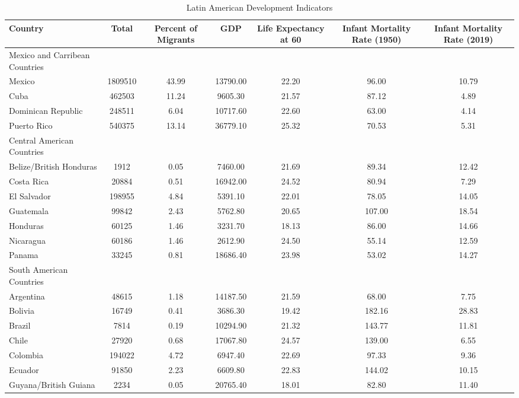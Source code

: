 \begin{table}[ht]
\centering
\caption{Latin American Development Indicators} 
\begin{tabular}{l|cccccc}
  \hline
Country & Total & Percent of Migrants & GDP & Life Expectancy at 60 & Infant Mortality Rate (1950) & Infant Mortality Rate (2019) \\ 
  \hline
Mexico and Carribean Countries &  &  &  &  &  &  \\ 
  Mexico & 1809510 & 43.99 & 13790.00 & 22.20 & 96.00 & 10.79 \\ 
  Cuba & 462503 & 11.24 & 9605.30 & 21.57 & 87.12 & 4.89 \\ 
  Dominican Republic & 248511 & 6.04 & 10717.60 & 22.60 & 63.00 & 4.14 \\ 
  Puerto Rico & 540375 & 13.14 & 36779.10 & 25.32 & 70.53 & 5.31 \\ 
  Central American Countries &  &  &  &  &  &  \\ 
  Belize/British Honduras & 1912 & 0.05 & 7460.00 & 21.69 & 89.34 & 12.42 \\ 
  Costa Rica & 20884 & 0.51 & 16942.00 & 24.52 & 80.94 & 7.29 \\ 
  El Salvador & 198955 & 4.84 & 5391.10 & 22.01 & 78.05 & 14.05 \\ 
  Guatemala & 99842 & 2.43 & 5762.80 & 20.65 & 107.00 & 18.54 \\ 
  Honduras & 60125 & 1.46 & 3231.70 & 18.13 & 86.00 & 14.66 \\ 
  Nicaragua & 60186 & 1.46 & 2612.90 & 24.50 & 55.14 & 12.59 \\ 
  Panama & 33245 & 0.81 & 18686.40 & 23.98 & 53.02 & 14.27 \\ 
  South American Countries &  &  &  &  &  &  \\ 
  Argentina & 48615 & 1.18 & 14187.50 & 21.59 & 68.00 & 7.75 \\ 
  Bolivia & 16749 & 0.41 & 3686.30 & 19.42 & 182.16 & 28.83 \\ 
  Brazil & 7814 & 0.19 & 10294.90 & 21.32 & 143.77 & 11.81 \\ 
  Chile & 27920 & 0.68 & 17067.80 & 24.57 & 139.00 & 6.55 \\ 
  Colombia & 194022 & 4.72 & 6947.40 & 22.69 & 97.33 & 9.36 \\ 
  Ecuador & 91850 & 2.23 & 6609.80 & 22.83 & 144.02 & 10.15 \\ 
  Guyana/British Guiana & 2234 & 0.05 & 20765.40 & 18.01 & 82.80 & 11.40 \\ 

\end{tabular}
\end{table}
